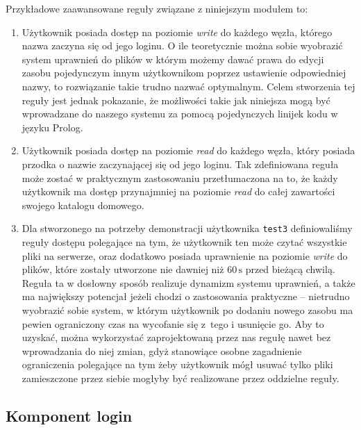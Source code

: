 \documentclass{classrep}
\begin{document}
Przykładowe zaawansowane reguły związane z niniejszym modułem to:
\begin{enumerate}
\item Użytkownik posiada dostęp na poziomie \emph{write} do każdego
węzła, którego nazwa zaczyna się od jego loginu. O ile teoretycznie
można sobie wyobrazić system uprawnień
do plików w którym możemy dawać prawa do edycji zasobu pojedynczym
innym użytkownikom poprzez ustawienie odpowiedniej nazwy, to
rozwiązanie takie trudno nazwać optymalnym. Celem stworzenia tej
reguły jest jednak pokazanie, że możliwości takie jak niniejsza
mogą być wprowadzane do naszego systemu za pomocą pojedynczych
linijek kodu w języku Prolog.

\vspace\baselineskip

\item Użytkownik posiada dostęp na poziomie \emph{read} do każdego 
węzła, który posiada przodka o nazwie zaczynającej się od jego loginu.
Tak zdefiniowana reguła może zostać w praktycznym zastosowaniu przetłumaczona
na to, że każdy użytkownik ma dostęp przynajmniej na poziomie \emph{read}
do całej zawartości swojego katalogu domowego.

\vspace\baselineskip

\item Dla stworzonego na potrzeby demonstracji użytkownika \texttt{test3}
definiowaliśmy reguły dostępu polegające na tym, że użytkownik ten
może czytać wszystkie pliki na serwerze, oraz dodatkowo posiada
uprawnienie na poziomie \emph{write} do plików, które zostały utworzone
nie dawniej niż \(60\,\mbox{s}\) przed bieżącą chwilą. Reguła ta
w dosłowny sposób realizuje dynamizm systemu uprawnień, a także
ma największy potencjał jeżeli chodzi o zastosowania praktyczne --
nietrudno wyobrazić sobie system, w którym użytkownik po dodaniu
nowego zasobu ma pewien ograniczony czas na wycofanie się z~tego
i usunięcie go. Aby to uzyskać, można wykorzystać zaprojektowaną
przez nas regułę nawet bez wprowadzania do niej zmian, gdyż
stanowiące osobne zagadnienie ograniczenia
polegające na tym żeby użytkownik mógł usuwać tylko pliki
zamieszczone przez siebie mogłyby być realizowane przez
oddzielne reguły.
\end{enumerate}

\subsection{Komponent login}
\end{document}
